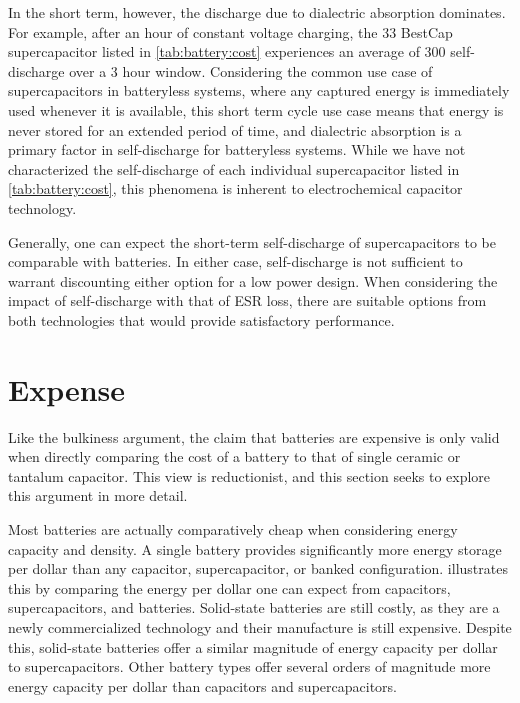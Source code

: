 In the short term, however, the discharge due to dialectric absorption dominates. For example, after an hour of constant voltage charging, the 33\ssi{\milli\farad} BestCap supercapacitor listed in \cref{tab:battery:cost} experiences an average of 300\ssi{\nano\ampere} self-discharge over a 3 hour window. Considering the common use case of supercapacitors in batteryless systems, where any captured energy is immediately used whenever it is available, this short term cycle use case means that energy is never stored for an extended period of time, and dialectric absorption is a primary factor in self-discharge for batteryless systems. While we have not characterized the self-discharge of each individual supercapacitor listed in \cref{tab:battery:cost}, this phenomena is inherent to electrochemical capacitor technology.


Generally, one can expect the short-term self-discharge of supercapacitors to be comparable with batteries. In either case, self-discharge is not sufficient to warrant discounting either option for a low power design. When considering the impact of self-discharge with that of ESR loss, there are suitable options from both technologies that would provide satisfactory performance.


\section{Expense}
\label{sec:battery:cost}
Like the bulkiness argument, the claim that batteries are expensive is only valid when directly comparing the cost of a battery to that of single ceramic or tantalum capacitor. This view is reductionist, and this section seeks to explore this argument in more detail.

Most batteries are actually comparatively cheap when considering energy capacity and density. 
A single battery provides significantly more energy storage per dollar than any capacitor, supercapacitor, or banked configuration.
 illustrates this by comparing the energy per dollar one can expect from capacitors, supercapacitors, and batteries. 
Solid-state batteries are still costly, as they are a newly commercialized technology and their manufacture is still expensive. 
Despite this, solid-state batteries offer a similar magnitude of energy capacity per dollar to supercapacitors.
Other battery types offer several orders of magnitude more energy capacity per dollar than capacitors and supercapacitors.

